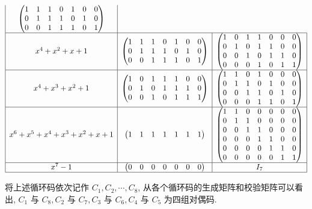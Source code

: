 \begin{solution}
$$\begin{array}{|c|c|c|}
\begin{pmatrix}
1 & 1 & 1 & 0 & 1 & 0 & 0 \\
0 & 1 & 1 & 1 & 0 & 1 & 0 \\
0 & 0 & 1 & 1 & 1 & 0 & 1 
\end{pmatrix} \\
\hline
x^4 + x^2 + x + 1 &
\begin{pmatrix}
1 & 1 & 1 & 0 & 1 & 0 &0\\
0 & 1 & 1 & 1 & 0 & 1&0\\
0&0 & 1 & 1 & 1 & 0 & 1
\end{pmatrix} &
\begin{pmatrix}
1 & 0 & 1 & 1 & 0 & 0 & 0 \\
0 & 1 & 0 & 1 & 1 & 0 & 0 \\
0 & 0 & 1 & 0 & 1 & 1 & 0 \\
0 & 0 & 0 & 1 & 0 & 1 & 1
\end{pmatrix} \\
\hline
x^4 + x^3 + x^2 + 1 &
\begin{pmatrix}
1 & 0 & 1 & 1 & 1 & 0&0 \\
0 & 1 & 0 & 1 & 1 & 1&0\\
0& 0 & 1 & 0 & 1 & 1 & 1
\end{pmatrix} &
\begin{pmatrix}
1 & 1 & 0 & 1 & 0 & 0 & 0 \\
0 & 1 & 1 & 0 & 1 & 0 & 0 \\
0 & 0 & 1 & 1 & 0 & 1 & 0 \\
0 & 0 & 0 & 1 & 1 & 0 & 1
\end{pmatrix} \\
\hline
x^6 + x^5 + x^4 + x^3 + x^2 + x + 1 &
\begin{pmatrix}
1 & 1 & 1 & 1 & 1 & 1 & 1
\end{pmatrix} &
\begin{pmatrix}
1 & 1 & 0 & 0 & 0 & 0 & 0 \\
0 & 1 & 1 & 0 & 0 & 0 & 0 \\
0 & 0 & 1 & 1 & 0 & 0 & 0 \\
0 & 0 & 0 & 1 & 1 & 0 & 0 \\
0 & 0 & 0 & 0 & 1 & 1 & 0 \\
0 & 0 & 0 & 0 & 0 & 1 & 1
\end{pmatrix} \\
\hline
x^7 - 1 &
\begin{pmatrix}
0 & 0 & 0 & 0 & 0 & 0 & 0
\end{pmatrix} & I_7 \\
\hline
\end{array}
 $$




 将上述循环码依次记作 $ C_{1}, C_{2}, \cdots, C_{8} $, 从各个循环码的生成矩阵和校验矩阵可以看出, $ C_{1} $ 与 $ C_{8}, C_{2} $ 与 $ C_{7}, C_{3} $ 与 $ C_{6}, C_{4} $ 与 $ C_{5} $ 为四组对偶码.
\end{solution}





